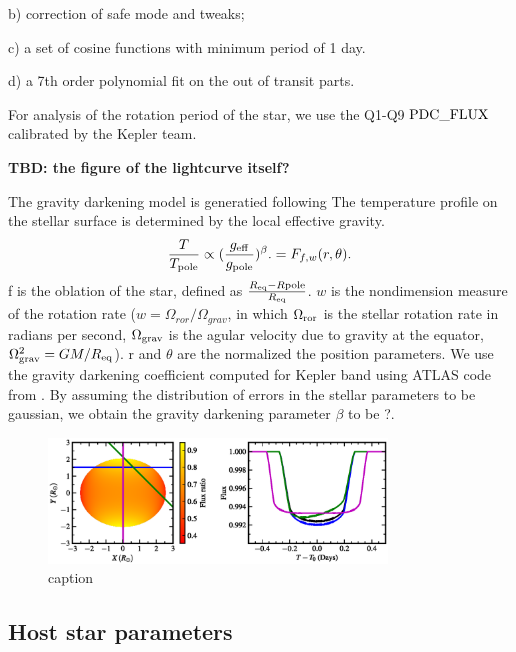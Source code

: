 \documentclass[preprint]{emulateapj}
\begin{document}
b) correction of safe mode and tweaks;

c) a set of cosine functions with minimum period of 1 day. 

d) a 7th order polynomial fit on the out of transit parts. 

For analysis of the rotation period of the star, we use the Q1-Q9 
$\rm PDC\_FLUX$ \citep{Smith:2012} calibrated by the Kepler team. 

{\bf TBD: the figure of the lightcurve itself?}


The gravity darkening model is generatied following 
\citet{Barnes:2009}
The temperature profile on the stellar surface is determined by the local 
effective gravity.
\begin{equation}
\frac{T}{T_{\rm pole}} \propto (\frac{g_{\rm eff}}{g_{\rm pole}})^{\beta}. 
= F_{f,w} (r,\theta).
\end{equation}
f is the oblation of the star, defined as 
$\frac{R_{\rm eq}-R{\rm pole}}{R_{\rm eq}}$. $w$ is the nondimension 
measure of the rotation rate ($w=\Omega_{ror}/\Omega_{grav}$, in which 
$\Omega_{\rm ror}$ is the stellar rotation rate in radians per second, 
$\Omega_{\rm grav}$ is the agular velocity due to gravity at the equator, 
$\Omega_{\rm grav}^2 = GM/R_{\rm eq}$). r and $\theta$ are the normalized 
the position parameters. We use the gravity darkening coefficient computed 
for Kepler band using ATLAS code from \citet{Claret:2011}. By assuming the 
distribution of errors in the stellar parameters to be gaussian, we obtain 
the gravity darkening parameter $\beta$ to be ?.


\begin{figure}
  \centering
  \includegraphics[width=9cm]{obliq_model.eps}
  \caption{caption}
  \label{fig:obliqmodel}
\end{figure}

\subsection{Host star parameters}
\label{sec:host-star-parameters}
\end{document}
